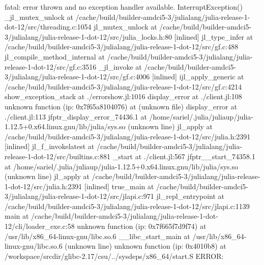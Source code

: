 fatal: error thrown and no exception handler available.
InterruptException()
_jl_mutex_unlock at /cache/build/builder-amdci5-3/julialang/julia-release-1-dot-12/src/threading.c:1054
jl_mutex_unlock at /cache/build/builder-amdci5-3/julialang/julia-release-1-dot-12/src/julia_locks.h:80 [inlined]
jl_type_infer at /cache/build/builder-amdci5-3/julialang/julia-release-1-dot-12/src/gf.c:488
jl_compile_method_internal at /cache/build/builder-amdci5-3/julialang/julia-release-1-dot-12/src/gf.c:3516
_jl_invoke at /cache/build/builder-amdci5-3/julialang/julia-release-1-dot-12/src/gf.c:4006 [inlined]
ijl_apply_generic at /cache/build/builder-amdci5-3/julialang/julia-release-1-dot-12/src/gf.c:4214
show_exception_stack at ./errorshow.jl:1016
display_error at ./client.jl:108
unknown function (ip: 0x7f65a8104076) at (unknown file)
display_error at ./client.jl:113
jfptr_display_error_74436.1 at /home/sariel/.julia/juliaup/julia-1.12.5+0.x64.linux.gnu/lib/julia/sys.so (unknown line)
jl_apply at /cache/build/builder-amdci5-3/julialang/julia-release-1-dot-12/src/julia.h:2391 [inlined]
jl_f_invokelatest at /cache/build/builder-amdci5-3/julialang/julia-release-1-dot-12/src/builtins.c:881
_start at ./client.jl:567
jfptr__start_74358.1 at /home/sariel/.julia/juliaup/julia-1.12.5+0.x64.linux.gnu/lib/julia/sys.so (unknown line)
jl_apply at /cache/build/builder-amdci5-3/julialang/julia-release-1-dot-12/src/julia.h:2391 [inlined]
true_main at /cache/build/builder-amdci5-3/julialang/julia-release-1-dot-12/src/jlapi.c:971
jl_repl_entrypoint at /cache/build/builder-amdci5-3/julialang/julia-release-1-dot-12/src/jlapi.c:1139
main at /cache/build/builder-amdci5-3/julialang/julia-release-1-dot-12/cli/loader_exe.c:58
unknown function (ip: 0x7f665f7d9f74) at /usr/lib/x86_64-linux-gnu/libc.so.6
__libc_start_main at /usr/lib/x86_64-linux-gnu/libc.so.6 (unknown line)
unknown function (ip: 0x4010b8) at /workspace/srcdir/glibc-2.17/csu/../sysdeps/x86_64/start.S
ERROR: 